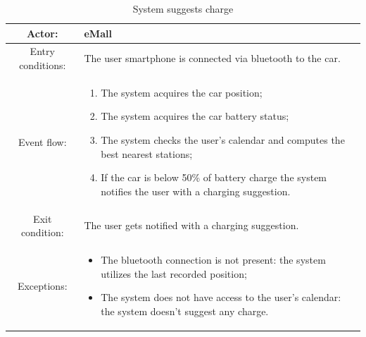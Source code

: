 \begin{table}[h]
    \begin{center}
        \begin{tabular}{|c||p{10cm}|}
            \hline
            Actor:            & \ac{eMall}                                                  \\
            \hline
            Entry conditions: & The user smartphone is connected via bluetooth  to the car. \\
            \hline
            Event flow:       &
            \begin{enumerate}
                \item The system acquires the car position;
                \item The system acquires the car battery status;
                \item The system checks the user's calendar and computes the best nearest stations;
                \item If the car is below 50\% of battery charge the system notifies the user with a charging suggestion.
            \end{enumerate}
            \\
            \hline
            Exit condition:   & The user gets notified with a charging suggestion.          \\
            \hline
            Exceptions:       &
            \begin{itemize}
                \item The bluetooth connection is not present: the system utilizes the last recorded position;
                \item The system does not have access to the user's calendar: the system doesn't suggest any charge.
            \end{itemize}
            \\
            \hline
        \end{tabular}
    \end{center}
    \caption{System suggests charge}
\end{table}

